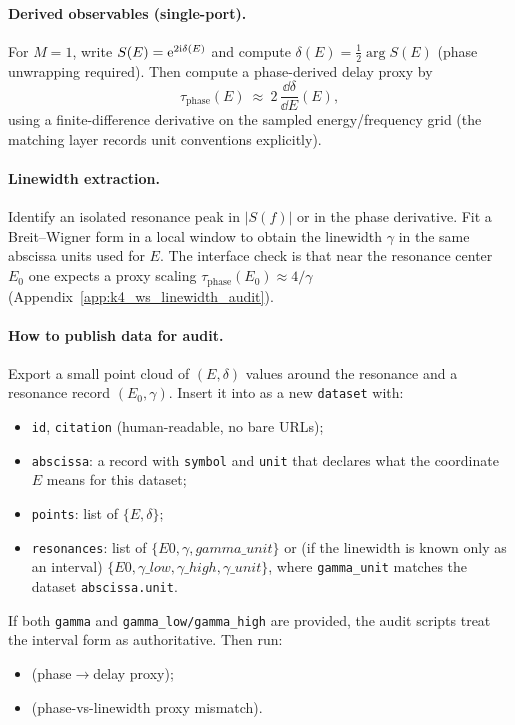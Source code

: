 \paragraph{Derived observables (single-port).}
For $M=1$, write $S(E)=\mathrm{e}^{2\mathrm{i}\delta(E)}$ and compute $\delta(E)=\tfrac12\arg S(E)$ (phase unwrapping required).
Then compute a phase-derived delay proxy by
$$
\tau_{\mathrm{phase}}(E)\ \approx\ 2\,\frac{\dd\delta}{\dd E}(E),
$$
using a finite-difference derivative on the sampled energy/frequency grid (the matching layer records unit conventions explicitly).

\paragraph{Linewidth extraction.}
Identify an isolated resonance peak in $|S(f)|$ or in the phase derivative.
Fit a Breit--Wigner form in a local window to obtain the linewidth $\gamma$ in the same abscissa units used for $E$.
The interface check is that near the resonance center $E_0$ one expects a proxy scaling $\tau_{\mathrm{phase}}(E_0)\approx 4/\gamma$ (Appendix~\ref{app:k4_ws_linewidth_audit}).

\paragraph{How to publish data for audit.}
Export a small point cloud of $(E,\delta)$ values around the resonance and a resonance record $(E_0,\gamma)$.
Insert it into  as a new \texttt{dataset} with:
\begin{itemize}
\item \texttt{id}, \texttt{citation} (human-readable, no bare URLs);
\item \texttt{abscissa}: a record with \texttt{symbol} and \texttt{unit} that declares what the coordinate $E$ means for this dataset;
\item \texttt{points}: list of $\{E,\delta\}$;
\item \texttt{resonances}: list of $\{E0,\gamma,gamma\_unit\}$ or (if the linewidth is known only as an interval) $\{E0,\gamma\_low,\gamma\_high,\gamma\_unit\}$, where \texttt{gamma\_unit} matches the dataset \texttt{abscissa.unit}.
\end{itemize}
If both \texttt{gamma} and \texttt{gamma\_low/gamma\_high} are provided, the audit scripts treat the interval form as authoritative.
Then run:
\begin{itemize}
\item {} (phase$\to$delay proxy);
\item {} (phase-vs-linewidth proxy mismatch).
\end{itemize}


